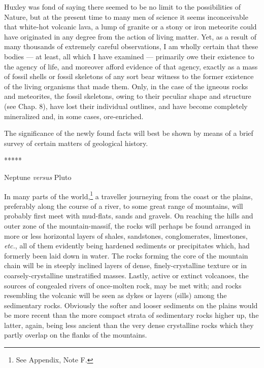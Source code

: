 \documentclass[a4paper, 12pt, oneside]{article}
\begin{document}
Huxley was fond of saying there seemed to be no limit to the possibilities of Nature, but at the present time to many men of science it seems inconceivable that white-hot volcanic lava, a lump of granite or a stony or iron meteorite could have originated in any degree from the action of living matter. Yet, as a result of many thousands of extremely careful observations, I am wholly certain that these bodies --- at least, all which I have examined --- primarily owe their existence to the agency of life, and moreover afford evidence of that agency, exactly as a mass of fossil shells or fossil skeletons of any sort bear witness to the former existence of the living organisms that made them. Only, in the case of the igneous rocks and meteorites, the fossil skeletons, owing to their peculiar shape and structure (see Chap. 8), have lost their individual outlines, and have become completely mineralized and, in some cases, ore-enriched.

The significance of the newly found facts will best be shown by means of a brief survey of certain matters of geological history.

\centerline{*\hspace{15mm}*\hspace{15mm}*\hspace{15mm}*\hspace{15mm}*}
\bigskip

\centerline{Neptune \emph{versus} Pluto}

In many parts of the world,\footnote{See Appendix, Note F.} a traveller journeying from the coast or the plains, preferably along the course of a river, to some great range of mountains, will probably first meet with mud-flats, sands and gravels. On reaching the hills and outer zone of the mountain-massif, the rocks will perhaps be found arranged in more or less horizontal layers of shales, sandstones, conglomerates, limestones, \emph{etc.}, all of them evidently being hardened sediments or precipitates which, had formerly been laid down in water. The rocks forming the core of the mountain chain will be in steeply inclined layers of dense, finely-crystalline texture or in coarsely-crystalline unstratified masses. Lastly, active or extinct volcanoes, the sources of congealed rivers of once-molten rock, may be met with; and rocks resembling the volcanic will be seen as dykes or layers (sills) among the sedimentary rocks. Obviously the softer and looser sediments on the plains would be more recent than the more compact strata of sedimentary rocks higher up, the latter, again, being less ancient than the very dense crystalline rocks which they partly overlap on the flanks of the mountains.
\end{document}
